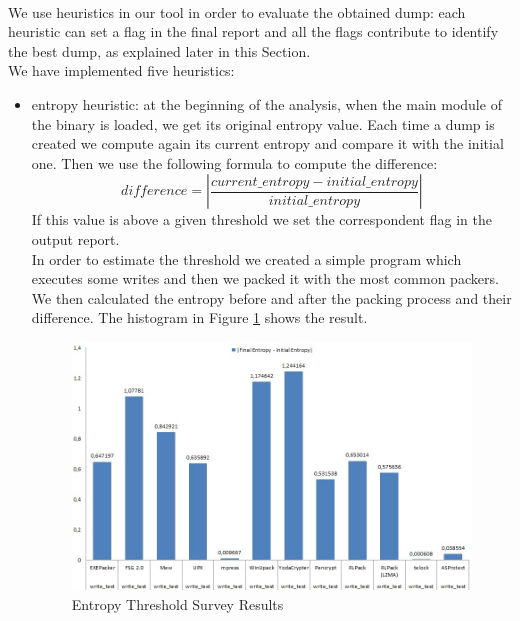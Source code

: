 \paragraph{}
We use heuristics in our tool in order to evaluate the obtained dump: each heuristic can set a flag in the final report and all the flags contribute to identify the best dump, as explained later in this Section.\\
We have implemented five heuristics:
\begin{itemize}
\item entropy heuristic: at the beginning of the analysis, when the main module of the binary is loaded, we get its original entropy value. Each time a dump is created we compute again its current entropy and compare it with the initial one. Then we use the following formula to compute the difference:
\begin{equation}
difference = \left|\frac{current\_entropy - initial\_entropy}{initial\_entropy}\right|
\end{equation}
If this value is above a given threshold we set the correspondent flag in the output report.\\
In order to estimate the threshold we created a simple program which executes some writes and then we packed it with the most common packers. We then calculated the entropy before and after the packing process and their difference. The histogram in Figure \ref{Entropy Threshold Survey Results} shows the result.
\begin{figure}[!ht]
	\begin{center}
   		\includegraphics [width=\textwidth]{./pictures/Entropy Threshold Survey Results.jpg}
	\end{center}
	\caption{Entropy Threshold Survey Results}
	\label{Entropy Threshold Survey Results}

\end{figure}
\end{itemize}
